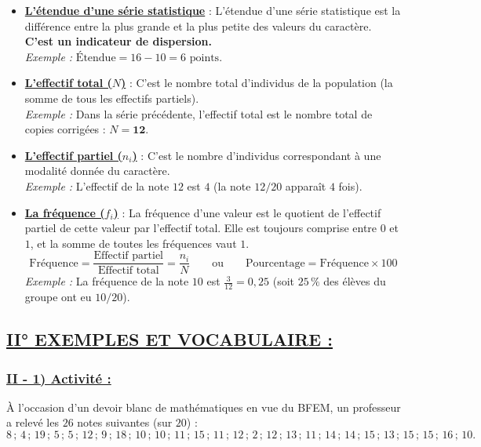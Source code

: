 \documentclass[11pt, a4paper]{article}
\begin{document}
\begin{itemize}
    \textit{Exemple des notes obtenues :} la note minimale est $10$ et la note maximale est $16$.
    \item \textbf{\underline{L'étendue d'une série statistique}} : L'étendue d'une série statistique est la différence entre la plus grande et la plus petite des valeurs du caractère. \textbf{C'est un indicateur de dispersion.} \\
    \textit{Exemple :} $\text{Étendue} = 16 - 10 = 6\text{ points}$.
    \item \textbf{\underline{L'effectif total ($N$)}} : C'est le nombre total d'individus de la population (la somme de tous les effectifs partiels). \\
    \textit{Exemple :} Dans la série précédente, l'effectif total est le nombre total de copies corrigées : $N = \mathbf{12}$.
    \item \textbf{\underline{L'effectif partiel ($n_i$)}} : C'est le nombre d'individus correspondant à une modalité donnée du caractère. \\
    \textit{Exemple :} L'effectif de la note $12$ est $4$ (la note $12/20$ apparaît $4$ fois).
    \item \textbf{\underline{La fréquence ($f_i$)}} : La fréquence d'une valeur est le quotient de l'effectif partiel de cette valeur par l'effectif total. Elle est toujours comprise entre $0$ et $1$, et la somme de toutes les fréquences vaut $1$.
    \[
        \text{Fréquence} = \frac{\text{Effectif partiel}}{\text{Effectif total}} = \frac{n_i}{N} \qquad \text{ou} \qquad \text{Pourcentage} = \text{Fréquence} \times 100
    \]
    \textit{Exemple :} La fréquence de la note $10$ est $\frac{3}{12} = 0,25$ (soit $25\,\%$ des élèves du groupe ont eu $10/20$).
\end{itemize}

\subsection*{\textcolor{primary}{\underline{II° EXEMPLES ET VOCABULAIRE :}}}

\subsubsection*{\textcolor{accent}{\underline{II - 1) Activité :}}}
À l'occasion d'un devoir blanc de mathématiques en vue du BFEM, un professeur a relevé les $26$ notes suivantes (sur $20$) :
\[
    8 \,;\, 4 \,;\, 19 \,;\, 5 \,;\, 5 \,;\, 12 \,;\, 9 \,;\, 18 \,;\, 10 \,;\, 10 \,;\, 11 \,;\, 15 \,;\, 11 \,;\, 12 \,;\, 2 \,;\, 12 \,;\, 13 \,;\, 11 \,;\, 14 \,;\, 14 \,;\, 15 \,;\, 13 \,;\, 15 \,;\, 15 \,;\, 16 \,;\, 10.
\]
\end{document}

